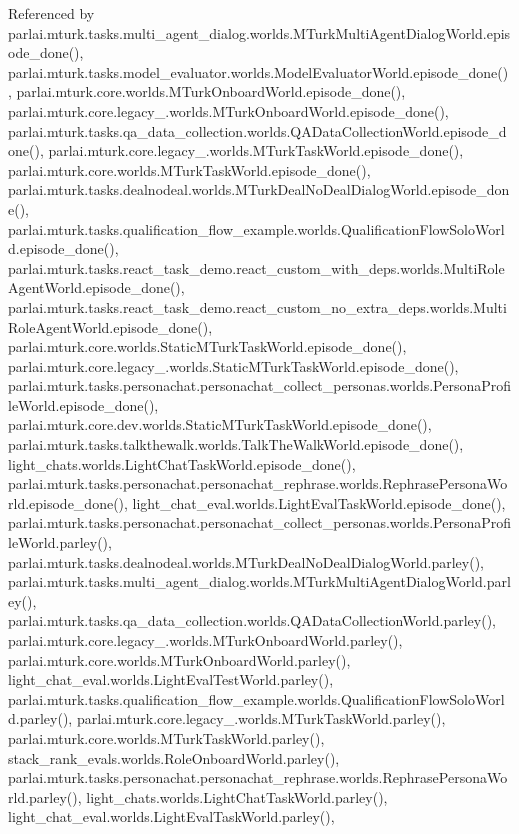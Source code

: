 Referenced by parlai.\+mturk.\+tasks.\+multi\+\_\+agent\+\_\+dialog.\+worlds.\+M\+Turk\+Multi\+Agent\+Dialog\+World.\+episode\+\_\+done(), parlai.\+mturk.\+tasks.\+model\+\_\+evaluator.\+worlds.\+Model\+Evaluator\+World.\+episode\+\_\+done(), parlai.\+mturk.\+core.\+worlds.\+M\+Turk\+Onboard\+World.\+episode\+\_\+done(), parlai.\+mturk.\+core.\+legacy\+\_.\+worlds.\+M\+Turk\+Onboard\+World.\+episode\+\_\+done(), parlai.\+mturk.\+tasks.\+qa\+\_\+data\+\_\+collection.\+worlds.\+Q\+A\+Data\+Collection\+World.\+episode\+\_\+done(), parlai.\+mturk.\+core.\+legacy\+\_.\+worlds.\+M\+Turk\+Task\+World.\+episode\+\_\+done(), parlai.\+mturk.\+core.\+worlds.\+M\+Turk\+Task\+World.\+episode\+\_\+done(), parlai.\+mturk.\+tasks.\+dealnodeal.\+worlds.\+M\+Turk\+Deal\+No\+Deal\+Dialog\+World.\+episode\+\_\+done(), parlai.\+mturk.\+tasks.\+qualification\+\_\+flow\+\_\+example.\+worlds.\+Qualification\+Flow\+Solo\+World.\+episode\+\_\+done(), parlai.\+mturk.\+tasks.\+react\+\_\+task\+\_\+demo.\+react\+\_\+custom\+\_\+with\+\_\+deps.\+worlds.\+Multi\+Role\+Agent\+World.\+episode\+\_\+done(), parlai.\+mturk.\+tasks.\+react\+\_\+task\+\_\+demo.\+react\+\_\+custom\+\_\+no\+\_\+extra\+\_\+deps.\+worlds.\+Multi\+Role\+Agent\+World.\+episode\+\_\+done(), parlai.\+mturk.\+core.\+worlds.\+Static\+M\+Turk\+Task\+World.\+episode\+\_\+done(), parlai.\+mturk.\+core.\+legacy\+\_.\+worlds.\+Static\+M\+Turk\+Task\+World.\+episode\+\_\+done(), parlai.\+mturk.\+tasks.\+personachat.\+personachat\+\_\+collect\+\_\+personas.\+worlds.\+Persona\+Profile\+World.\+episode\+\_\+done(), parlai.\+mturk.\+core.\+dev.\+worlds.\+Static\+M\+Turk\+Task\+World.\+episode\+\_\+done(), parlai.\+mturk.\+tasks.\+talkthewalk.\+worlds.\+Talk\+The\+Walk\+World.\+episode\+\_\+done(), light\+\_\+chats.\+worlds.\+Light\+Chat\+Task\+World.\+episode\+\_\+done(), parlai.\+mturk.\+tasks.\+personachat.\+personachat\+\_\+rephrase.\+worlds.\+Rephrase\+Persona\+World.\+episode\+\_\+done(), light\+\_\+chat\+\_\+eval.\+worlds.\+Light\+Eval\+Task\+World.\+episode\+\_\+done(), parlai.\+mturk.\+tasks.\+personachat.\+personachat\+\_\+collect\+\_\+personas.\+worlds.\+Persona\+Profile\+World.\+parley(), parlai.\+mturk.\+tasks.\+dealnodeal.\+worlds.\+M\+Turk\+Deal\+No\+Deal\+Dialog\+World.\+parley(), parlai.\+mturk.\+tasks.\+multi\+\_\+agent\+\_\+dialog.\+worlds.\+M\+Turk\+Multi\+Agent\+Dialog\+World.\+parley(), parlai.\+mturk.\+tasks.\+qa\+\_\+data\+\_\+collection.\+worlds.\+Q\+A\+Data\+Collection\+World.\+parley(), parlai.\+mturk.\+core.\+legacy\+\_.\+worlds.\+M\+Turk\+Onboard\+World.\+parley(), parlai.\+mturk.\+core.\+worlds.\+M\+Turk\+Onboard\+World.\+parley(), light\+\_\+chat\+\_\+eval.\+worlds.\+Light\+Eval\+Test\+World.\+parley(), parlai.\+mturk.\+tasks.\+qualification\+\_\+flow\+\_\+example.\+worlds.\+Qualification\+Flow\+Solo\+World.\+parley(), parlai.\+mturk.\+core.\+legacy\+\_.\+worlds.\+M\+Turk\+Task\+World.\+parley(), parlai.\+mturk.\+core.\+worlds.\+M\+Turk\+Task\+World.\+parley(), stack\+\_\+rank\+\_\+evals.\+worlds.\+Role\+Onboard\+World.\+parley(), parlai.\+mturk.\+tasks.\+personachat.\+personachat\+\_\+rephrase.\+worlds.\+Rephrase\+Persona\+World.\+parley(), light\+\_\+chats.\+worlds.\+Light\+Chat\+Task\+World.\+parley(), light\+\_\+chat\+\_\+eval.\+worlds.\+Light\+Eval\+Task\+World.\+parley(), 